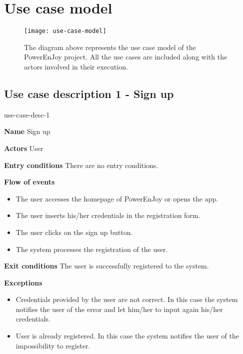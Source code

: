 \section{Use case model}

\begin{figure}[H]
	\centering
	\texttt{[image: use-case-model]}
	\caption[Use case model]{The diagram above represents the use case model of the PowerEnJoy project. All the use cases are included along with the actors involved in their execution.}
	\label{fig:use-case-model}
\end{figure}

\subsection{Use case description 1 - Sign up}
\begin{labeling}{use-case-desc-1}
	\item[\textbf{Name}] Sign up
	\item[\textbf{Actors}] User
	\item[\textbf{Entry conditions}] There are no entry conditions.
	\item[\textbf{Flow of events}]
		\begin{itemize}
			\item[]
			\item The user accesses the homepage of PowerEnJoy or opens the app.
			\item The user inserts his/her credentials in the registration form.
			\item The user clicks on the sign up button.
			\item The system processes the registration of the user.
		\end{itemize}
	\item[\textbf{Exit conditions}] The user is successfully registered to the system.
	\item[\textbf{Exceptions}]
		\begin{itemize}
			\item[]
			\item Credentials provided by the user are not correct. In this case the system notifies the user of the error and let him/her to input again his/her credentials. 
			\item User is already registered. In this case the system notifies the user of the impossibility to register.
		\end{itemize}
\end{labeling}

